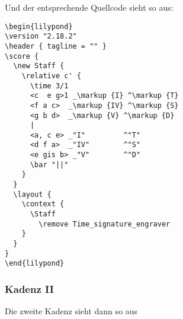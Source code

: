 Und der entsprechende Quellcode sieht so aus:
\begin{verbatim}
\begin{lilypond}
\version "2.18.2"
\header { tagline = "" }
\score {
  \new Staff {
    \relative c' { 
      \time 3/1
      <c  e g>1 _\markup {I} ^\markup {T}
      <f a c>  _\markup {IV} ^\markup {S}
      <g b d>  _\markup {V} ^\markup {D}
      |
      <a, c e> _"I"         ^"T"
      <d f a>  _"IV"        ^"S"
      <e gis b> _"V"        ^"D"
      \bar "||"
    }   
  }
  \layout {
    \context {
      \Staff
        \remove Time_signature_engraver
    }
  }
}
\end{lilypond}
\end{verbatim}


\subsubsection{Kadenz II}

Die zweite Kadenz sieht dann so aus


